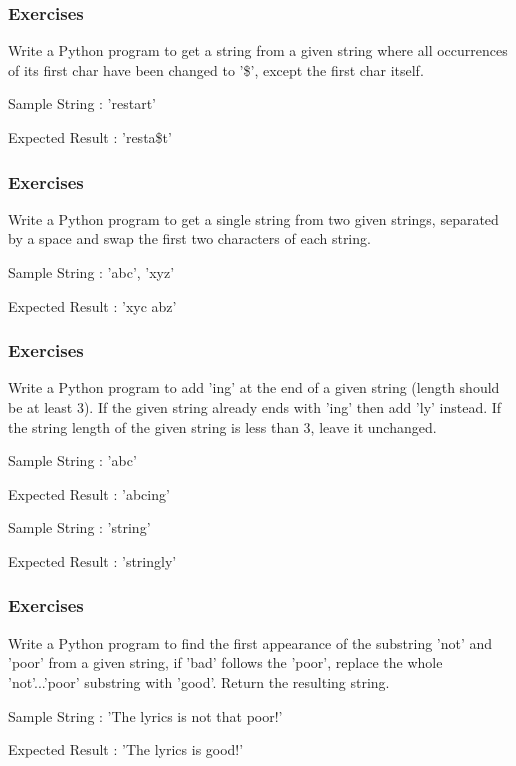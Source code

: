 \begin{frame}[fragile]\frametitle{Exercises}
Write a Python program to get a string from a given string where all occurrences of its first char have been changed to '\$', except the first char itself. 
 
Sample String : 'restart'

Expected Result : 'resta\$t'
\end{frame}


\begin{frame}[fragile]\frametitle{Exercises}
Write a Python program to get a single string from two given strings, separated by a space and swap the first two characters of each string.

Sample String : 'abc', 'xyz' 

Expected Result : 'xyc abz'
\end{frame}

\begin{frame}[fragile]\frametitle{Exercises}
Write a Python program to add 'ing' at the end of a given string (length should be at least 3). If the given string already ends with 'ing' then add 'ly' instead. If the string length of the given string is less than 3, leave it unchanged. 

Sample String : 'abc'

Expected Result : 'abcing' 

Sample String : 'string'

Expected Result : 'stringly'

\end{frame}

\begin{frame}[fragile]\frametitle{Exercises}
Write a Python program to find the first appearance of the substring 'not' and 'poor' from a given string, if 'bad' follows the 'poor', replace the whole 'not'...'poor' substring with 'good'. Return the resulting string. 

Sample String : 'The lyrics is not that poor!'

Expected Result : 'The lyrics is good!'

\end{frame}

